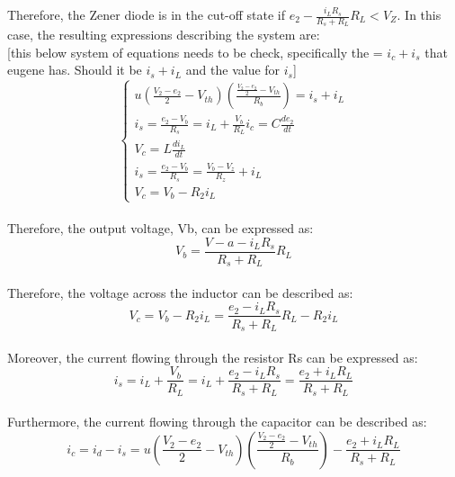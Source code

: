 Therefore, the Zener diode is in the cut-off state if $e_2 - \frac{i_L R_s}{R_s+R_L} R_L < V_Z$. In this case, the resulting expressions describing the system are:\\


[this below system of equations needs to be check, specifically the = $i_c+i_s$ that eugene has. Should it be $i_s+i_L$ and the value for $i_s $]
\begin{equation}
    \begin{cases}
        u(\frac{V_2-e_2}{2}-V_{th})(\frac{\frac{V_2-e_2}{2}-V_{th}}{R_b})=i_s+i_L\\
        i_s=\frac{e_2-V_b}{R_s}=i_L+\frac{V_b}{R_L}
        i_c=C\frac{de_2}{dt}\\
        V_c=L\frac{di_L}{dt}\\
        i_s=\frac{e_2-V_b}{R_s}=\frac{V_b-V_z}{R_z}+i_L\\
        V_c=V_b-R_2i_L
    \end{cases}
\end{equation}\\

Therefore, the output voltage, Vb, can be expressed as:\\

\begin{equation}
    V_b=\frac{V-a-i_LR_s}{R_s+R_L}R_L
\end{equation}\\

Therefore, the voltage across the inductor can be described as:\\

\begin{equation}
    V_c=V_b-R_2i_L=\frac{e_2-i_LR_s}{R_s+R_L}R_L-R_2i_L
\end{equation}\\

Moreover, the current flowing through the resistor Rs can be expressed as:\\

\begin{equation}
    i_s=i_L+\frac{V_b}{R_L}=i_L+\frac{e_2-i_LR_s}{R_s+R_L}=\frac{e_2+i_LR_L}{R_s+R_L}
\end{equation}\\

Furthermore, the current flowing through the capacitor can be described as:\\

\begin{equation}
    i_c=i_d-i_s=u(\frac{V_2-e_2}{2}-V_{th})(\frac{\frac{V_2-e_2}{2}-V_{th}}{R_b})-\frac{e_2+i_LR_L}{R_s+R_L}
\end{equation}\\

